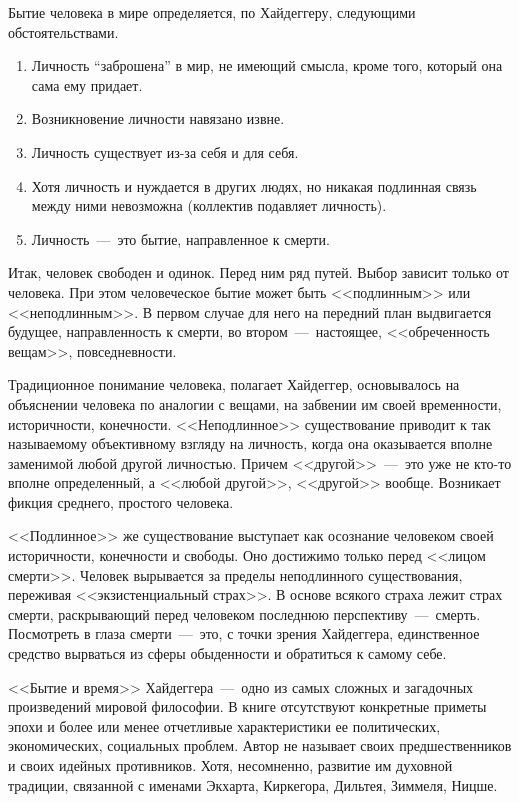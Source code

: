 \documentclass{bmstu}
\begin{document}
Бытие человека в мире определяется, по Хайдеггеру, следующими обстоятельствами.

\begin{enumerate}
	\item Личность “заброшена” в мир, не имеющий смысла, кроме того, который она сама ему придает.
	\item Возникновение личности навязано извне.
	\item Личность существует из-за себя и для себя.
	\item Хотя личность и нуждается в других людях, но никакая подлинная связь между ними невозможна (коллектив подавляет личность).
	\item Личность~---~это бытие, направленное к смерти.
\end{enumerate}

Итак, человек свободен и одинок. Перед ним ряд путей. Выбор зависит только от человека. При этом человеческое бытие может быть <<подлинным>> или <<неподлинным>>. В первом случае для него на передний план выдвигается будущее, направленность к смерти, во втором~---~настоящее, <<обреченность вещам>>, повседневности.

Традиционное понимание человека, полагает Хайдеггер, основывалось на объяснении человека по аналогии с вещами, на забвении им своей временности, историчности, конечности. <<Неподлинное>> существование приводит к так называемому объективному взгляду на личность, когда она оказывается вполне заменимой любой другой личностью. Причем <<другой>>~---~это уже не кто-то вполне определенный, а <<любой другой>>, <<другой>> вообще. Возникает фикция среднего, простого человека.

<<Подлинное>> же существование выступает как осознание человеком своей историчности, конечности и свободы. Оно достижимо только перед <<лицом смерти>>. Человек вырывается за пределы неподлинного существования, переживая <<экзистенциальный страх>>. В основе всякого страха лежит страх смерти, раскрывающий перед человеком последнюю перспективу~---~смерть. Посмотреть в глаза смерти~---~это, с точки зрения Хайдеггера, единственное средство вырваться из сферы обыденности и обратиться к самому себе.

<<Бытие и время>> Хайдеггера~---~одно из самых сложных и загадочных произведений мировой философии. В книге отсутствуют конкретные приметы эпохи и более или менее отчетливые характеристики ее политических, экономических, социальных проблем. Автор не называет своих предшественников и своих идейных противников. Хотя, несомненно, развитие им духовной традиции, связанной с именами Экхарта, Киркегора, Дильтея, Зиммеля, Ницше.
\end{document}
